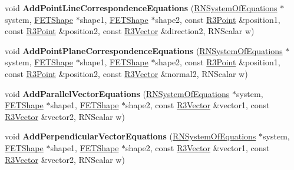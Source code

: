 \begin{DoxyCompactItemize}
\item 
void {\bfseries Add\+Point\+Line\+Correspondence\+Equations} (\hyperlink{class_r_n_system_of_equations}{R\+N\+System\+Of\+Equations} $\ast$system, \hyperlink{struct_f_e_t_shape}{F\+E\+T\+Shape} $\ast$shape1, \hyperlink{struct_f_e_t_shape}{F\+E\+T\+Shape} $\ast$shape2, const \hyperlink{class_r3_point}{R3\+Point} \&position1, const \hyperlink{class_r3_point}{R3\+Point} \&position2, const \hyperlink{class_r3_vector}{R3\+Vector} \&direction2, R\+N\+Scalar w)\hypertarget{struct_f_e_t_reconstruction_a63d982da3f4c7df07bc309fd0bd307ab}{}\label{struct_f_e_t_reconstruction_a63d982da3f4c7df07bc309fd0bd307ab}

\item 
void {\bfseries Add\+Point\+Plane\+Correspondence\+Equations} (\hyperlink{class_r_n_system_of_equations}{R\+N\+System\+Of\+Equations} $\ast$system, \hyperlink{struct_f_e_t_shape}{F\+E\+T\+Shape} $\ast$shape1, \hyperlink{struct_f_e_t_shape}{F\+E\+T\+Shape} $\ast$shape2, const \hyperlink{class_r3_point}{R3\+Point} \&position1, const \hyperlink{class_r3_point}{R3\+Point} \&position2, const \hyperlink{class_r3_vector}{R3\+Vector} \&normal2, R\+N\+Scalar w)\hypertarget{struct_f_e_t_reconstruction_acb711236cb4c2f4ef5115c22c65a155f}{}\label{struct_f_e_t_reconstruction_acb711236cb4c2f4ef5115c22c65a155f}

\item 
void {\bfseries Add\+Parallel\+Vector\+Equations} (\hyperlink{class_r_n_system_of_equations}{R\+N\+System\+Of\+Equations} $\ast$system, \hyperlink{struct_f_e_t_shape}{F\+E\+T\+Shape} $\ast$shape1, \hyperlink{struct_f_e_t_shape}{F\+E\+T\+Shape} $\ast$shape2, const \hyperlink{class_r3_vector}{R3\+Vector} \&vector1, const \hyperlink{class_r3_vector}{R3\+Vector} \&vector2, R\+N\+Scalar w)\hypertarget{struct_f_e_t_reconstruction_aa9735859721cc79d0c1a375dbce60cb5}{}\label{struct_f_e_t_reconstruction_aa9735859721cc79d0c1a375dbce60cb5}

\item 
void {\bfseries Add\+Perpendicular\+Vector\+Equations} (\hyperlink{class_r_n_system_of_equations}{R\+N\+System\+Of\+Equations} $\ast$system, \hyperlink{struct_f_e_t_shape}{F\+E\+T\+Shape} $\ast$shape1, \hyperlink{struct_f_e_t_shape}{F\+E\+T\+Shape} $\ast$shape2, const \hyperlink{class_r3_vector}{R3\+Vector} \&vector1, const \hyperlink{class_r3_vector}{R3\+Vector} \&vector2, R\+N\+Scalar w)\hypertarget{struct_f_e_t_reconstruction_a87d5aec54faf6e958799bdab1bc41481}{}\label{struct_f_e_t_reconstruction_a87d5aec54faf6e958799bdab1bc41481}


\end{DoxyCompactItemize}
